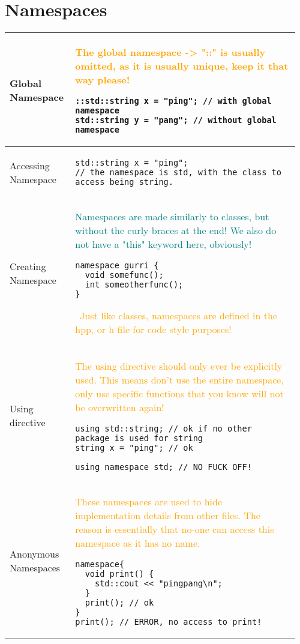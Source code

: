 \documentclass[main.tex,fontsize=8pt,paper=a4,paper=portrait,DIV=calc,]{scrartcl}
\begin{document}
\begin{table}[ht!]
\section{Namespaces}
\begin{tabular}{|m{0.2\linewidth}|m{0.755\linewidth}|}
\hline
Global Namespace & 
\textcolor{orange}{The global namespace -> "::" is usually omitted, as it is usually unique, keep it that way please!}\newline
\begin{lstlisting}
::std::string x = "ping"; // with global namespace
std::string y = "pang"; // without global namespace
\end{lstlisting}\\
\hline
Accessing Namespace & 
\begin{lstlisting}
std::string x = "ping";
// the namespace is std, with the class to access being string.
\end{lstlisting}\\
\hline
Creating Namespace & 
\textcolor{teal}{Namespaces are made similarly to classes, but without the curly braces at the end!\newline
We also do not have a "this" keyword here, obviously!}\newline
\begin{lstlisting}
namespace gurri {
  void somefunc();
  int someotherfunc();
}
\end{lstlisting}
\, \newline
\textcolor{orange}{Just like classes, namespaces are defined in the hpp, or h file for code style purposes!}\\
\hline
Using directive & 
\textcolor{orange}{The using directive should only ever be explicitly used.\newline
This means don't use the entire namespace, only use specific functions that you know will not be overwritten again!}\newline
\begin{lstlisting}
using std::string; // ok if no other package is used for string
string x = "ping"; // ok

using namespace std; // NO FUCK OFF!
\end{lstlisting}\\
\hline
Anonymous Namespaces & 
\textcolor{orange}{These namespaces are used to hide implementation details from other files.\newline
The reason is essentially that no-one can access this namespace as it has no name.}\newline
\begin{lstlisting}
namespace{
  void print() {
    std::cout << "pingpang\n";
  }
  print(); // ok
}
print(); // ERROR, no access to print!
\end{lstlisting}\\
\hline
\end{tabular}
\end{table}
\end{document}
